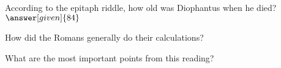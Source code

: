 \documentclass[nooutcomes]{ximera}
\begin{document}
\begin{question}
According to the epitaph riddle, how old was Diophantus when he died? $\answer[given]{84}$
\end{question}

\begin{question}
How did the Romans generally do their calculations?
\begin{multipleChoice}
\end{multipleChoice}
\end{question}


\begin{question}
What are the most important points from this reading?
\begin{freeResponse}
\end{freeResponse}

\end{question}
\end{document}
